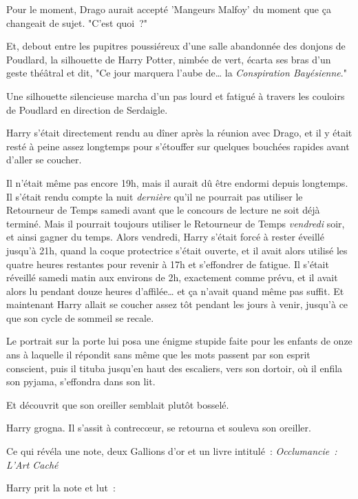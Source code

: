 Pour le moment, Drago aurait accepté 'Mangeurs Malfoy' du moment que ça changeait de sujet. "C'est quoi~?"

Et, debout entre les pupitres poussiéreux d'une salle abandonnée des donjons de Poudlard, la silhouette de Harry Potter, nimbée de vert, écarta ses bras d'un geste théâtral et dit, "Ce jour marquera l'aube de… la \emph{Conspiration Bayésienne}."

\later

Une silhouette silencieuse marcha d'un pas lourd et fatigué à travers les couloirs de Poudlard en direction de Serdaigle.

Harry s'était directement rendu au dîner après la réunion avec Drago, et il y était resté à peine assez longtemps pour s'étouffer sur quelques bouchées rapides avant d'aller se coucher.

Il n'était même pas encore 19h, mais il aurait dû être endormi depuis longtemps. Il s'était rendu compte la nuit \emph{dernière} qu'il ne pourrait pas utiliser le Retourneur de Temps samedi avant que le concours de lecture ne soit déjà terminé. Mais il pourrait toujours utiliser le Retourneur de Temps \emph{vendredi} soir, et ainsi gagner du temps. Alors vendredi, Harry s'était forcé à rester éveillé jusqu'à 21h, quand la coque protectrice s'était ouverte, et il avait alors utilisé les quatre heures restantes pour revenir à 17h et s'effondrer de fatigue. Il s'était réveillé samedi matin aux environs de 2h, exactement comme prévu, et il avait alors lu pendant douze heures d'affilée… et ça n'avait quand même pas suffit. Et maintenant Harry allait se coucher assez tôt pendant les jours à venir, jusqu'à ce que son cycle de sommeil se recale.

Le portrait sur la porte lui posa une énigme stupide faite pour les enfants de onze ans à laquelle il répondit sans même que les mots passent par son esprit conscient, puis il tituba jusqu'en haut des escaliers, vers son dortoir, où il enfila son pyjama, s'effondra dans son lit.

Et découvrit que son oreiller semblait plutôt bosselé.

Harry grogna. Il s'assit à contrecœur, se retourna et souleva son oreiller.

Ce qui révéla une note, deux Gallions d'or et un livre intitulé~: \emph{Occlumancie~: L'Art Caché}

Harry prit la note et lut~:


